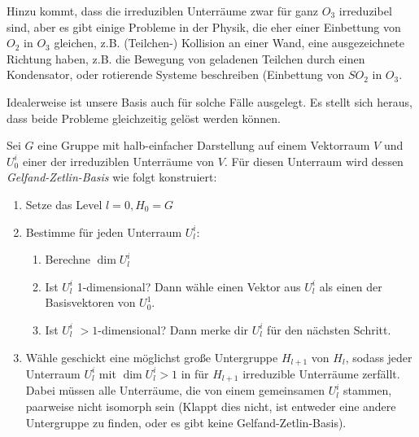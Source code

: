 \begin{remark}
	\label{rem:einbettung_in_physik}
 Hinzu kommt, dass die irreduziblen Unterräume zwar für ganz $O_3$ irreduzibel sind, aber es gibt einige Probleme in der Physik, die eher einer Einbettung von $O_2$ in $O_3$ gleichen, z.B. (Teilchen-) Kollision an einer Wand, eine ausgezeichnete Richtung haben, z.B. die Bewegung von geladenen Teilchen durch einen Kondensator, oder rotierende Systeme beschreiben (Einbettung von $SO_2$ in $O_3$.
\end{remark}

 \begin{remark}
 	Idealerweise ist unsere Basis auch für solche Fälle ausgelegt. Es stellt sich heraus, dass beide Probleme gleichzeitig gelöst werden können.
 \end{remark}
 \begin{definition}
 	\label{def:konstruktion_gz_basis}
	Sei $G$ eine Gruppe mit halb-einfacher Darstellung auf einem Vektorraum $V$ und $U^i_0$ einer der irreduziblen Unterräume von $V$. Für diesen Unterraum wird dessen \emph{Gelfand-Zetlin-Basis} wie folgt konstruiert:
	\begin{enumerate}[label={\arabic*.)}]
		\item Setze das Level $l=0, H_0 = G$
		\item Bestimme für jeden Unterraum $U_l^i$: \label{def:gz_it_anfang}
		\begin{enumerate}
			\item Berechne $\dim{U_l^i}$
			\item Ist $U_l^i$ 1-dimensional? Dann wähle einen Vektor aus $U_l^i$ als einen der Basisvektoren von $U^1_0$.
			\item Ist $U_l^i$ $>1$-dimensional? Dann merke dir $U_l^i$ für den nächsten Schritt.
		\end{enumerate}
		\item Wähle geschickt eine möglichst große Untergruppe $H_{l+1}$ von $H_{l}$, sodass jeder Unterraum $U_l^i$ mit $\dim{U_l^i}>1$ in für $H_{l+1}$ irreduzible Unterräume  zerfällt. Dabei müssen alle Unterräume, die von einem gemeinsamen $U_l^i$ stammen, paarweise nicht isomorph sein (Klappt dies nicht, ist entweder eine andere Untergruppe zu finden, oder es gibt keine Gelfand-Zetlin-Basis). \label{def:gz_it_ugschritt}

\end{enumerate}
\end{definition}
